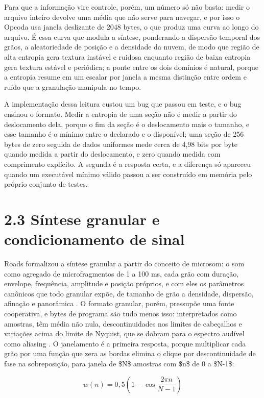 \documentclass[11pt,a4paper]{article}
\begin{document}
Para que a informação vire controle, porém, um número só não basta: medir o arquivo inteiro devolve uma média que não serve para navegar, e por isso o Opcoda usa janela deslizante de 2048 bytes, o que produz uma curva ao longo do arquivo. É essa curva que modula a síntese, ponderando a dispersão temporal dos grãos, a aleatoriedade de posição e a densidade da nuvem, de modo que região de alta entropia gera textura instável e ruidosa enquanto região de baixa entropia gera textura estável e periódica; a ponte entre os dois domínios é natural, porque a entropia resume em um escalar por janela a mesma distinção entre ordem e ruído que a granulação manipula no tempo.


A implementação dessa leitura custou um bug que passou em teste, e o bug ensinou o formato. Medir a entropia de uma seção não é medir a partir do deslocamento dela, porque o fim da seção é o deslocamento mais o tamanho, e esse tamanho é o mínimo entre o declarado e o disponível; uma seção de 256 bytes de zero seguida de dados uniformes mede cerca de 4,98 bits por byte quando medida a partir do deslocamento, e zero quando medida com comprimento explícito. A segunda é a resposta certa, e a diferença só apareceu quando um executável mínimo válido passou a ser construído em memória pelo próprio conjunto de testes.


\section*{2.3 Síntese granular e condicionamento de sinal}

Roads formalizou a síntese granular a partir do conceito de microsom: o som como agregado de microfragmentos de 1 a 100 ms, cada grão com duração, envelope, frequência, amplitude e posição próprios, e com eles os parâmetros canônicos que todo granular expõe, de tamanho de grão a densidade, dispersão, afinação e panorâmica \cite{roads2001}. O formato granular, porém, pressupõe uma fonte cooperativa, e bytes de programa são tudo menos isso: interpretados como amostras, têm média não nula, descontinuidades nos limites de cabeçalhos e variações acima do limite de Nyquist, que se dobram para o espectro audível como aliasing \cite{smith2007, zolzer2011}. O janelamento é a primeira resposta, porque multiplicar cada grão por uma função que zera as bordas elimina o clique por descontinuidade de fase na sobreposição, para janela de \$N\$ amostras com \$n\$ de 0 a \$N-1\$:


\begin{equation}
w(n) = 0{,}5 \left(1 - \cos \frac{2 \pi n}{N - 1}\right)
\label{eq:hann}
\end{equation}
\end{document}
